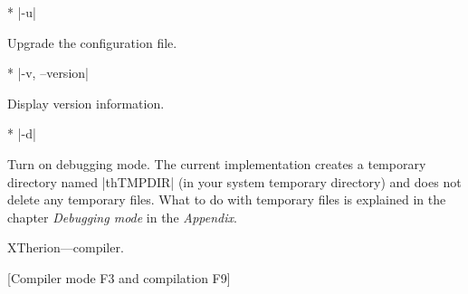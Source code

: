 * |-u|

        Upgrade the configuration file.

* |-v, --version|

        Display version information.        
        
* |-d|

        Turn on debugging mode. The current implementation creates a 
	temporary directory named |thTMPDIR| (in your system temporary 
	directory) and does not delete any temporary files. 
	What to do with temporary files is explained in the chapter
	{\it Debugging mode} in the {\it Appendix}.
\endoptions

\subsubchapter XTherion---compiler.

[Compiler mode F3 and compilation F9]


\endinput
